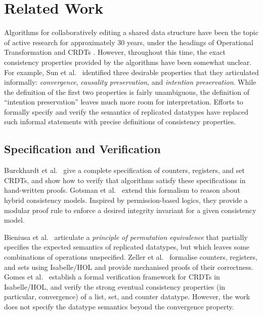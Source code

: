 \section{Related Work}\label{sec:relwork}

Algorithms for collaboratively editing a shared data structure have been the topic of active research for approximately 30 years, under the headings of Operational Transformation \cite{Ellis:1989ue,Ressel:1996wx,Sun:1998vf,Oster:2006tr} and CRDTs \cite{Shapiro:2011wy,Shapiro:2011un}.
However, throughout this time, the exact consistency properties provided by the algorithms have been somewhat unclear.
For example, Sun et al.~\cite{Sun:1998un} identified three desirable properties that they articulated informally: \emph{convergence}, \emph{causality preservation}, and \emph{intention preservation}.
While the definition of the first two properties is fairly unambiguous, the definition of ``intention preservation'' leaves much more room for interpretation.
Efforts to formally specify and verify the semantics of replicated datatypes have replaced such informal statements with precise definitions of consistency properties.

\subsection{Specification and Verification}

Burckhardt et al.~\cite{Burckhardt:2014ft} give a complete specification of counters, registers, and set CRDTs, and show how to verify that algorithms satisfy these specifications in hand-written proofs.
Gotsman et al.~\cite{DBLP:conf/popl/GotsmanYFNS16} extend this
formalism to reason about hybrid consistency models.
Inspired by permission-based logics, they provide a modular proof rule
to enforce a desired integrity invariant for a given consistency model.

Bieniusa et al.~\cite{Bieniusa:2012gt} articulate a \emph{principle of permutation equivalence} that partially specifies the expected semantics of replicated datatypes, but which leaves some combinations of operations unspecified.
Zeller et al.~\cite{Zeller:2014fl} formalise counters, registers, and sets using Isabelle/HOL and provide mechanised proofs of their correctness.
Gomes et al.~\cite{Gomes:2017gy} establish a formal verification framework for CRDTs in Isabelle/HOL, and verify the strong eventual consistency properties (in particular, convergence) of a list, set, and counter datatype.
However, the work does not specify the datatype semantics beyond the convergence property.


